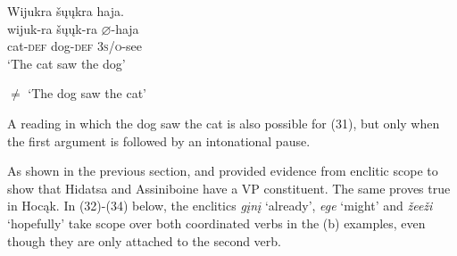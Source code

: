 \documentclass[output=paper]{LSP/langsci}
\begin{document}
\begin{exe}
\ex 
\glll Wijukra	\v{s}\k{u}\k{u}kra 		haja.\\
wijuk-ra 		\v{s}\k{u}\k{u}k-ra 		$\varnothing$-haja \\
cat-\textsc{def} 		dog-\textsc{def} 	\textsc{3s/o}-see \\
\trans `The cat saw the dog'

$\neq$ `The dog saw the cat'
\end{exe}

A reading in which the dog saw the cat is also possible for (31), but only when the first argument is followed by an intonational pause.
	
As shown in the previous section, \citet{Boyle2007} and \citet{West2003} provided evidence from enclitic scope to show that Hidatsa and Assiniboine have a VP constituent.  The same proves true in Hocąk.  In (32)-(34) below, the enclitics \textit{g\k{i}n\k{i}} `already', \textit{ege} `might' and \textit{\v{z}ee\v{z}i} `hopefully' take scope over both coordinated verbs in the (b) examples, even though they are only attached to the second verb.
\end{document}
